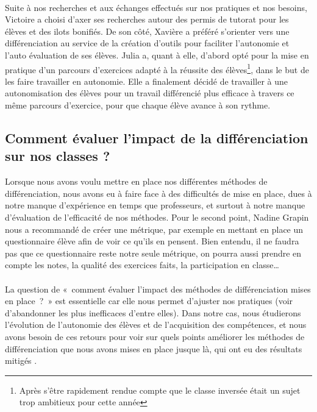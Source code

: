 \paragraph{}Suite à nos recherches et aux échanges effectués sur nos pratiques et nos besoins, Victoire a choisi d’axer ses recherches autour des permis de tutorat pour les élèves et des ilots bonifiés. De son côté, Xavière a préféré s’orienter vers une différenciation au service de la création d'outils pour faciliter l'autonomie et l'auto évaluation de ses élèves. Julia a, quant à elle, d’abord opté pour la mise en pratique d’un parcours d’exercices adapté à la réussite des élèves\footnote{Après s'être rapidement rendue compte que le classe inversée était un sujet trop ambitieux pour cette année}, dans le but de les faire travailler en autonomie. Elle a finalement décidé de travailler à une autonomisation des élèves pour un travail différencié plus efficace à travers ce même parcours d’exercice, pour que chaque élève avance à son rythme.
\subsection{Comment évaluer l'impact de la différenciation sur nos classes ?}

Lorsque nous avons voulu mettre en place nos différentes méthodes de différenciation, nous avons eu à faire face à des difficultés de mise en place, dues à notre manque d’expérience en temps que professeurs, et surtout à notre manque d’évaluation de l’efficacité de nos méthodes. Pour le second point, Nadine Grapin nous a recommandé de créer une métrique, par exemple en mettant en place un questionnaire élève afin de voir ce qu’ils en pensent. Bien entendu, il ne faudra pas que ce questionnaire reste notre seule métrique, on pourra aussi prendre en compte les notes, la qualité des exercices faits, la participation en classe\ldots
\paragraph{} La question de « comment évaluer l’impact des méthodes de différenciation mises en place ? » est essentielle car elle nous permet d'ajuster nos pratiques (voir d'abandonner les plus inefficaces d'entre elles). Dans notre cas, nous étudierons l’évolution de l’autonomie des élèves et de l’acquisition des compétences, et nous avons besoin de ces retours pour voir sur quels points améliorer les méthodes de différenciation que nous avons mises en place jusque là, qui ont eu des résultats mitigés .

